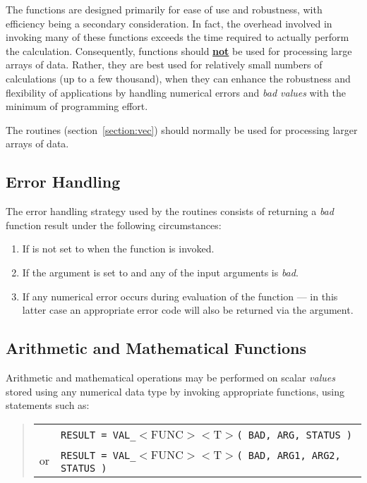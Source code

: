 The  functions are designed primarily for ease of use and
robustness, with efficiency being a secondary consideration.
In fact, the
overhead involved in invoking many of these functions exceeds the time
required to actually perform the calculation. 
Consequently,  functions should {\bf \underline{not}} be used
for processing large arrays of data. 
Rather, they are best used for relatively small numbers of calculations (up
to a few thousand), when they can enhance the robustness and flexibility of
applications by handling numerical errors and {\em bad values} with the
minimum of programming effort. 

The  routines (section~\ref{section:vec}) should normally be
used for processing larger arrays of data. 

\subsection{ Error Handling}
\label{section:val:error}

The error handling strategy used by the  routines consists of
returning a {\em bad} function result under the following circumstances: 

\begin{enumerate}

\item If  is not set to  when the function
is invoked.

\item If the  argument is set to  and any of
the input arguments is {\em bad}.

\item If any numerical error occurs during evaluation of the function --- in 
this latter case an appropriate error code will also be returned via the
 argument. 

\end{enumerate}

\subsection{ Arithmetic and Mathematical Functions}

Arithmetic and mathematical operations may be performed on scalar {\em 
values} stored using any numerical data type by invoking appropriate
 functions, using statements such as: 

\begin{quote}
\begin{tabular}{rl}
& \verb#RESULT = VAL_#$<$FUNC$><$T$>$\verb#( BAD, ARG, STATUS )#\\
or & \verb#RESULT = VAL_#$<$FUNC$><$T$>$\verb#( BAD, ARG1, ARG2, STATUS )#
\end{tabular}
\end{quote}

